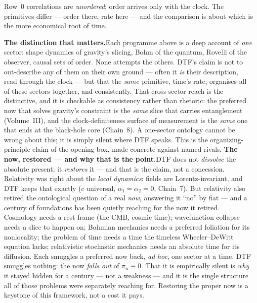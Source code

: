 \documentclass[11pt]{article}
\begin{document}
\begin{tcolorbox}
\begin{itemize}[leftmargin=1.5em,itemsep=3pt,topsep=3pt]
    Row~0 correlations are \emph{unordered}; order arrives only with the clock. The primitives differ ---
    order there, rate here --- and the comparison is about which is the more economical root of time.
\end{itemize}
\smallskip
\noindent\textbf{The distinction that matters.}\enspace Each programme above is a deep account of
\emph{one} sector: shape dynamics of gravity's slicing, Bohm of the quantum, Rovelli of the observer,
causal sets of order. None attempts the others. DTF's claim is not to out-describe any of them on their own
ground --- often it \emph{is} their description, read through the clock --- but that the \emph{same}
primitive, time's rate, organises all of these sectors together, and consistently. That cross-sector reach
is the distinctive, and it is checkable as consistency rather than rhetoric: the preferred now that solves
gravity's constraint is the \emph{same} slice that carries entanglement (Volume~III), and the
clock-definiteness surface of measurement is the \emph{same} one that ends at the black-hole core (Chain~8).
A one-sector ontology cannot be wrong about this; it is simply silent where DTF speaks. This is the
organizing-principle claim of the opening box, made concrete against named rivals.
\smallskip
\noindent\textbf{The now, restored --- and why that is the point.}\enspace DTF does not \emph{dissolve} the
absolute present; it \emph{restores} it --- and that is the claim, not a concession. Relativity was right
about the \emph{local dynamics}: fields are Lorentz-invariant, and DTF keeps that exactly ($c$ universal,
$\alpha_1=\alpha_2=0$, Chain~7). But relativity also retired the ontological question of a real \emph{now},
answering it ``no'' by fiat --- and a century of foundations has been quietly reaching for the now it
retired. Cosmology needs a rest frame (the CMB, cosmic time); wavefunction collapse needs a slice to happen
on; Bohmian mechanics needs a preferred foliation for its nonlocality; the problem of time needs a time the
timeless Wheeler--DeWitt equation lacks; relativistic stochastic mechanics needs an absolute time for its
diffusion. Each smuggles a preferred now back, \emph{ad hoc}, one sector at a time. DTF smuggles nothing:
the now \emph{falls out} of $\pi_u\equiv0$. That it is empirically silent is \emph{why} it stayed hidden for
a century --- not a weakness --- and it is the single structure all of those problems were separately
reaching for. Restoring the proper now is a keystone of this framework, not a cost it pays.
\end{tcolorbox}
\end{document}
